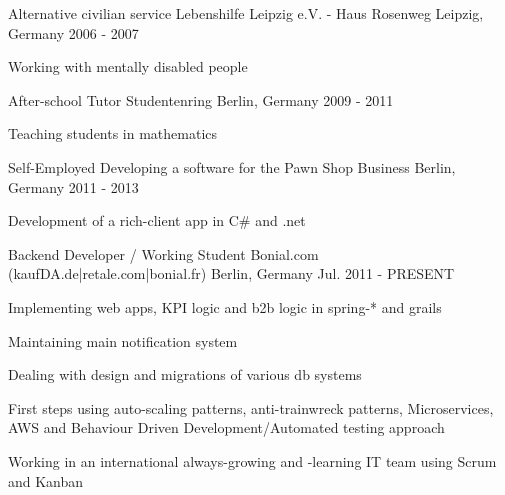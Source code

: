 


\begin{cventries}


\cventry
{Alternative civilian service} %
{Lebenshilfe Leipzig e.V. - Haus Rosenweg} %
{Leipzig, Germany} %
{2006 - 2007} %
{ %
\begin{cvitems}
\item {Working with mentally disabled people}
\end{cvitems}
}

\cventry
{After-school Tutor} %
{Studentenring} %
{Berlin, Germany} %
{2009 - 2011} %
{ %
\begin{cvitems}
\item {Teaching students in mathematics}
\end{cvitems}
}

\cventry
{Self-Employed} %
{Developing a software for the Pawn Shop Business} %
{Berlin, Germany} %
{2011 - 2013} %
{ %
\begin{cvitems}
\item {Development of a rich-client app in C\# and .net}
\end{cvitems}
}

\cventry
{Backend Developer / Working Student} %
{Bonial.com (kaufDA.de|retale.com|bonial.fr)} %
{Berlin, Germany} %
{Jul. 2011 - PRESENT} %
{ %
\begin{cvitems}
\item {Implementing web apps, KPI logic and b2b logic in spring-* and grails}
\item {Maintaining main notification system}
\item {Dealing with design and migrations of various db systems}
\item {First steps using auto-scaling patterns, anti-trainwreck patterns, Microservices, AWS and Behaviour Driven Development/Automated testing approach}
\item {Working in an international always-growing and -learning IT team using Scrum and Kanban}
\end{cvitems}
}



\end{cventries}